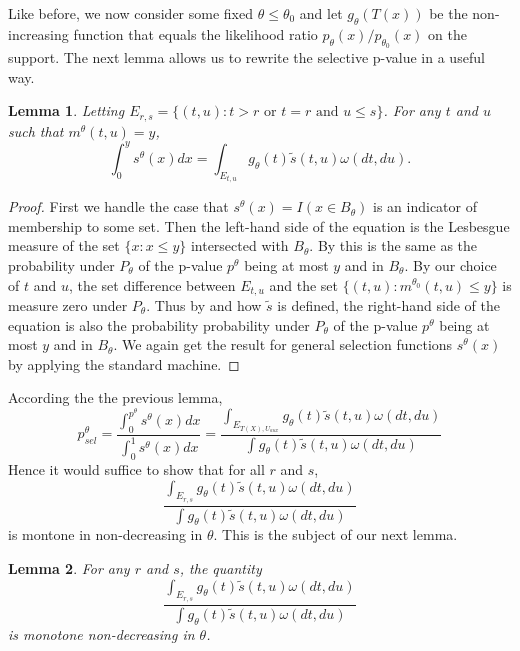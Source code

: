 \documentclass{article}
\newtheorem{lemma}{Lemma}
\begin{document}
\begin{appendix}
Like before, we now consider some fixed $\theta \leq \theta_0$ and let $g_{\theta}(T(x))$ be the non-increasing function that equals the likelihood ratio $p_{\theta}(x)/p_{\theta_0}(x)$ on the support. The next lemma allows us to rewrite the selective p-value in a useful way. 

\begin{lemma} Letting $E_{r, s} = \{(t, u) : t > r \text{ or } t = r \text{ and } u \leq s \}$. For any $t$ and $u$ such that $m^{\theta}(t, u) = y$,
\begin{equation*}
    \int_0^y s^{\theta}(x) dx = \int_{E_{t, u}} g_{\theta}(t) \tilde{s}(t, u) \omega(dt, du). 
\end{equation*}
\end{lemma}
\begin{proof}
   First we handle the case that $s^{\theta}(x) = I(x \in B_{\theta})$ is an indicator of membership to some set. Then the left-hand side of the equation is the Lesbesgue measure of the set $\{x : x \leq y \}$ intersected with $B_{\theta}$. By  this is the same as the probability under $P_{\theta}$ of the p-value $p^{\theta}$ being at most $y$ and in $B_{\theta}$. By our choice of $t$ and $u$, the set difference between $E_{t, u}$ and the set $\{(t, u): m^{\theta_0}(t, u) \leq y \}$ is measure zero under $P_{\theta}$. Thus by  and how $\tilde{s}$ is defined, the right-hand side of the equation is also the probability  probability under $P_{\theta}$ of the p-value $p^{\theta}$ being at most $y$ and in $B_{\theta}$. We again get the result for general selection functions $s^{\theta}(x)$ by applying the standard machine. 
\end{proof}

According the the previous lemma, 
\begin{equation*}
    p^{\theta}_{sel} = \frac{\int_{0}^{p^{\theta}} s^{\theta}(x) dx}{\int_{0}^{1} s^{\theta}(x) dx} = \frac{\int_{E_{T(X), U_{aux}}} g_{\theta}(t) \tilde{s}(t, u) \omega(dt, du) }{\int g_{\theta}(t) \tilde{s}(t, u) \omega(dt, du) }
\end{equation*}
Hence it would suffice to show that for all $r$ and $s$, 
\begin{equation*}
  \frac{\int_{E_{r, s}} g_{\theta}(t) \tilde{s}(t, u) \omega(dt, du) }{\int g_{\theta}(t) \tilde{s}(t, u) \omega(dt, du) }
\end{equation*}
is montone in non-decreasing in $\theta$. This is the subject of our next lemma.  

\begin{lemma}
    \label{prop:monotone_adjustment}
    For any $r$ and $s$, the quantity   
    \begin{equation*}
        \frac{\int_{E_{r, s}} g_{\theta}(t) \tilde{s}(t, u) \omega(dt, du) }{\int g_{\theta}(t) \tilde{s}(t, u) \omega(dt, du) }
      \end{equation*}
    is monotone non-decreasing in $\theta$. 
\end{lemma}


\end{appendix}
\end{document}
